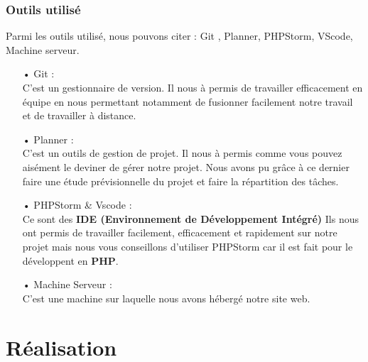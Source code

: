 \documentclass[12pt,a4paper]{article}
\begin{document}
\subsubsection{Outils utilisé}
Parmi les outils utilisé, nous pouvons citer : Git , Planner, PHPStorm, VScode, Machine serveur.
\begin{itemize}
\item[•] Git : \\
C'est un gestionnaire de version. Il nous à permis de travailler efficacement en équipe en nous
permettant notamment de fusionner facilement notre travail et de travailler à distance. 
\item[•] Planner : \\
C'est un outils de gestion de projet. Il nous à permis comme vous pouvez aisément le deviner de 
gérer notre projet. Nous avons pu grâce à ce dernier faire une étude prévisionnelle du projet et faire
la répartition des tâches.
\item[•] PHPStorm \& Vscode : \\
Ce sont des \textbf{IDE (Environnement de Développement Intégré)} Ils nous ont permis de
travailler facilement, efficacement et rapidement sur notre projet mais nous vous conseillons 
d'utiliser PHPStorm car il est fait pour le développent en \textbf{PHP}.
\item[•] Machine Serveur : \\
C'est une machine sur laquelle nous avons hébergé notre site web.
\end{itemize}

\section{Réalisation}
\end{document}
